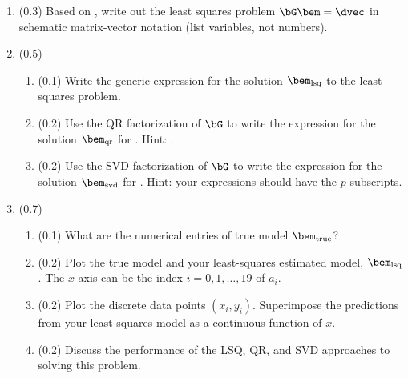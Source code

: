 \documentclass[11pt,titlepage,fleqn]{article}
\begin{document}
\begin{enumerate}
\item (0.3) Based on , write out the least squares problem $\bG\bem = \dvec$ in schematic matrix-vector notation (list variables, not numbers).


\item (0.5) 

\begin{enumerate}
\item (0.1) Write the generic expression for the solution $\bem_{\rm lsq}$ to the least squares problem.
\item (0.2) Use the QR factorization of $\bG$ to write the expression for the solution $\bem_{\rm qr}$ for \makebox{$\bG\bem = \dvec$}. Hint: \citet[][Appendix A]{Aster}.

\item (0.2) Use the SVD factorization of $\bG$ to write the expression for the solution $\bem_{\rm svd}$ for \makebox{$\bG\bem = \dvec$}. Hint: your expressions should have the $p$ subscripts.
\end{enumerate}

\item (0.7)

\begin{enumerate}
\item (0.1) What are the numerical entries of true model $\bem_{\rm true}$?

\item (0.2) Plot the true model and your least-squares estimated model, $\bem_{\rm lsq}$. The $x$-axis can be the index $i = 0,1,\ldots,19$ of $a_i$.

\item (0.2) Plot the discrete data points $(x_i,y_i)$. Superimpose the predictions from your least-squares model as a continuous function of $x$.


\item (0.2) Discuss the performance of the LSQ, QR, and SVD approaches to solving this problem.

\end{enumerate}

%


\end{enumerate}
\end{document}
